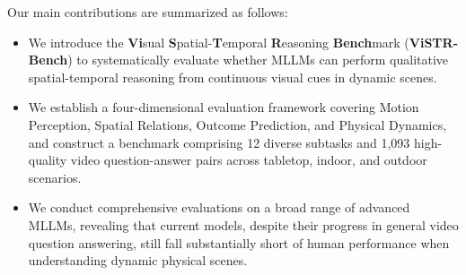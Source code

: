 Our main contributions are summarized as follows:
\begin{itemize}
\item We introduce the \textbf{Vi}sual \textbf{S}patial-\textbf{T}emporal \textbf{R}easoning \textbf{Bench}mark (\textbf{ViSTR-Bench}) to systematically evaluate whether MLLMs can perform qualitative spatial-temporal reasoning from continuous visual cues in dynamic scenes.

\item We establish a four-dimensional evaluation framework covering Motion Perception, Spatial Relations, Outcome Prediction, and Physical Dynamics, and construct a benchmark comprising 12 diverse subtasks and 1,093 high-quality video question-answer pairs across tabletop, indoor, and outdoor scenarios.

\item We conduct comprehensive evaluations on a broad range of advanced MLLMs, revealing that current models, despite their progress in general video question answering, still fall substantially short of human performance when understanding dynamic physical scenes.
\end{itemize}
